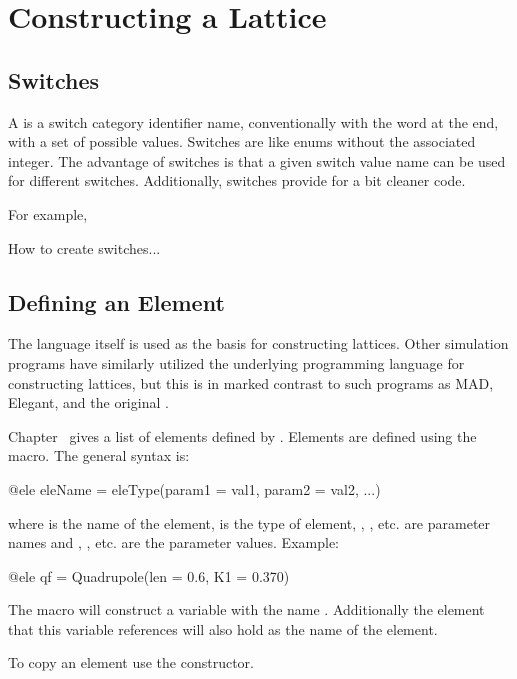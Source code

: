 \chapter{Constructing a Lattice}
\label{c:construct-lat}

\section{Switches}
\label{s:switch}

A  is a switch category identifier name, conventionally with the word  at the end, 
with a set of possible values. Switches are like enums without the associated integer. 
The advantage of switches is that a given switch value name can be used for different switches. 
Additionally, switches provide for a bit cleaner code.

For example, 

How to create switches...





\section{Defining an Element}
\label{s:ele.def}

The \julia language itself is used as the basis for constructing lattices. Other simulation programs
have similarly utilized the underlying programming language for constructing lattices\cite{merlin++,xsuite},
but this is in marked contrast to such programs as MAD\cite{mad}, Elegant\cite{elegant}, and the 
original \bmad\cite{bmad-orig}. 

Chapter~ gives a list of elements defined by \Bmad. Elements are defined using the 
macro. The general syntax is:
\begin{example}
  @ele eleName = eleType(param1 = val1, param2 = val2, ...)
\end{example}
where  is the name of the element,  is the type of element, , ,
etc. are parameter names and , , etc. are the parameter values.
Example:
\begin{example}
  @ele qf = Quadrupole(len = 0.6, K1 = 0.370)
\end{example}
The  macro will construct a \julia variable with the name . Additionally the element
that this variable references will also hold  as the name of the element.

To copy an element use the  constructor.


